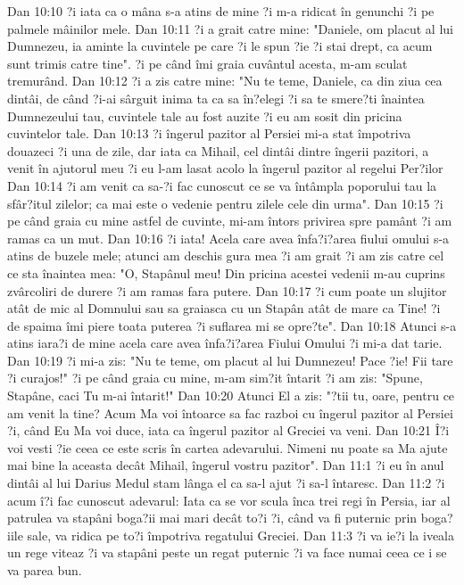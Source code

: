 Dan 10:10  ?i iata ca o mâna s-a atins de mine ?i m-a ridicat în genunchi ?i pe palmele mâinilor mele.
Dan 10:11  ?i a grait catre mine: "Daniele, om placut al lui Dumnezeu, ia aminte la cuvintele pe care ?i le spun ?ie ?i stai drept, ca acum sunt trimis catre tine". ?i pe când îmi graia cuvântul acesta, m-am sculat tremurând.
Dan 10:12  ?i a zis catre mine: "Nu te teme, Daniele, ca din ziua cea dintâi, de când ?i-ai sârguit inima ta ca sa în?elegi ?i sa te smere?ti înaintea Dumnezeului tau, cuvintele tale au fost auzite ?i eu am sosit din pricina cuvintelor tale.
Dan 10:13  ?i îngerul pazitor al Persiei mi-a stat împotriva douazeci ?i una de zile, dar iata ca Mihail, cel dintâi dintre îngerii pazitori, a venit în ajutorul meu ?i eu l-am lasat acolo la îngerul pazitor al regelui Per?ilor
Dan 10:14  ?i am venit ca sa-?i fac cunoscut ce se va întâmpla poporului tau la sfâr?itul zilelor; ca mai este o vedenie pentru zilele cele din urma".
Dan 10:15  ?i pe când graia cu mine astfel de cuvinte, mi-am întors privirea spre pamânt ?i am ramas ca un mut.
Dan 10:16  ?i iata! Acela care avea înfa?i?area fiului omului s-a atins de buzele mele; atunci am deschis gura mea ?i am grait ?i am zis catre cel ce sta înaintea mea: "O, Stapânul meu! Din pricina acestei vedenii m-au cuprins zvârcoliri de durere ?i am ramas fara putere.
Dan 10:17  ?i cum poate un slujitor atât de mic al Domnului sau sa graiasca cu un Stapân atât de mare ca Tine! ?i de spaima îmi piere toata puterea ?i suflarea mi se opre?te".
Dan 10:18  Atunci s-a atins iara?i de mine acela care avea înfa?i?area Fiului Omului ?i mi-a dat tarie.
Dan 10:19  ?i mi-a zis: "Nu te teme, om placut al lui Dumnezeu! Pace ?ie! Fii tare ?i curajos!" ?i pe când graia cu mine, m-am sim?it întarit ?i am zis: "Spune, Stapâne, caci Tu m-ai întarit!"
Dan 10:20  Atunci El a zis: "?tii tu, oare, pentru ce am venit la tine? Acum Ma voi întoarce sa fac razboi cu îngerul pazitor al Persiei ?i, când Eu Ma voi duce, iata ca îngerul pazitor al Greciei va veni.
Dan 10:21  Î?i voi vesti ?ie ceea ce este scris în cartea adevarului. Nimeni nu poate sa Ma ajute mai bine la aceasta decât Mihail, îngerul vostru pazitor".
Dan 11:1  ?i eu în anul dintâi al lui Darius Medul stam lânga el ca sa-l ajut ?i sa-l întaresc.
Dan 11:2  ?i acum î?i fac cunoscut adevarul: Iata ca se vor scula înca trei regi în Persia, iar al patrulea va stapâni boga?ii mai mari decât to?i ?i, când va fi puternic prin boga?iile sale, va ridica pe to?i împotriva regatului Greciei.
Dan 11:3  ?i va ie?i la iveala un rege viteaz ?i va stapâni peste un regat puternic ?i va face numai ceea ce i se va parea bun.
